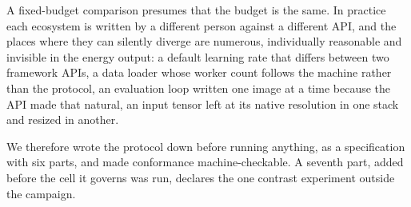 A fixed-budget comparison presumes that the budget is the same. In practice each
ecosystem is written by a different person against a different API, and the
places where they can silently diverge are numerous, individually reasonable and
invisible in the energy output: a default learning rate that differs between two
framework APIs, a data loader whose worker count follows the machine rather than
the protocol, an evaluation loop written one image at a time because the API
made that natural, an input tensor left at its native resolution in one stack
and resized in another.

We therefore wrote the protocol down before running anything, as a
specification with six parts, and made conformance machine-checkable. A seventh
part, added before the cell it governs was run, declares the one contrast
experiment outside the campaign.

